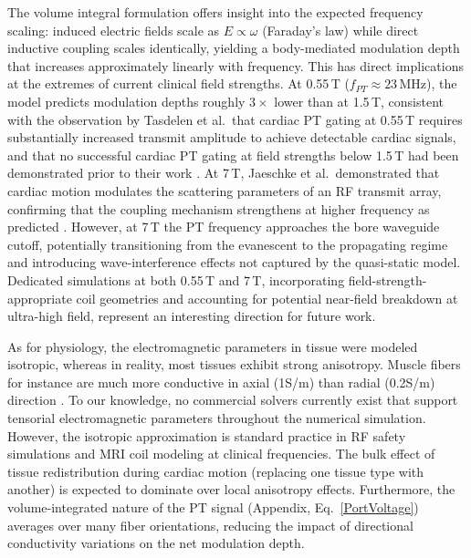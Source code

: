 \documentclass[
]{article}
\begin{document}
The volume integral formulation offers insight into the expected frequency scaling: induced electric fields scale as $E \propto \omega$ (Faraday's law) while direct inductive coupling scales identically, yielding a body-mediated modulation depth that increases approximately linearly with frequency. This has direct implications at the extremes of current clinical field strengths. At 0.55\,T ($f_{PT} \approx 23$\,MHz), the model predicts modulation depths roughly $3\times$ lower than at 1.5\,T, consistent with the observation by Tasdelen et al.\ that cardiac PT gating at 0.55\,T requires substantially increased transmit amplitude to achieve detectable cardiac signals, and that no successful cardiac PT gating at field strengths below 1.5\,T had been demonstrated prior to their work \cite{Tasdelen2025ContactlessHAPTIC}. At 7\,T, Jaeschke et al.\ demonstrated that cardiac motion modulates the scattering parameters of an RF transmit array, confirming that the coupling mechanism strengthens at higher frequency as predicted \cite{Jaeschke2018Cardiac7T}. However, at 7\,T the PT frequency approaches the bore waveguide cutoff, potentially transitioning from the evanescent to the propagating regime and introducing wave-interference effects not captured by the quasi-static model. Dedicated simulations at both 0.55\,T and 7\,T, incorporating field-strength-appropriate coil geometries and accounting for potential near-field breakdown at ultra-high field, represent an interesting direction for future work.

As for physiology, the electromagnetic parameters in tissue were modeled
isotropic, whereas in reality, most tissues exhibit strong anisotropy.
Muscle fibers for instance are much more conductive in axial (1S/m) than
radial (0.2S/m) direction \cite{Beck2005AAmplitudes}. To our knowledge, no commercial
solvers currently exist that support tensorial electromagnetic
parameters throughout the numerical simulation.
However, the isotropic approximation is standard practice in RF safety simulations and MRI coil modeling at clinical frequencies. The bulk effect of tissue redistribution during cardiac motion (replacing one tissue type with another) is expected to dominate over local anisotropy effects. Furthermore, the volume-integrated nature of the PT signal (Appendix, Eq.~\ref{PortVoltage}) averages over many fiber orientations, reducing the impact of directional conductivity variations on the net modulation depth.
\end{document}
